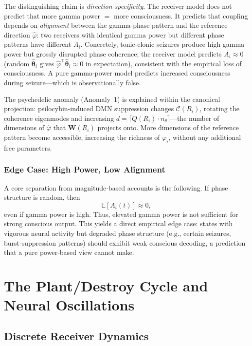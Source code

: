 \documentclass[12pt]{article}
\begin{document}
The distinguishing claim is \emph{direction-specificity}. The receiver model does not predict that more gamma power $= $ more consciousness. It predicts that coupling depends on \emph{alignment} between the gamma-phase pattern and the reference direction $\hat{\varphi}$: two receivers with identical gamma power but different phase patterns have different $A_i$. Concretely, tonic-clonic seizures produce high gamma power but grossly disrupted phase coherence; the receiver model predicts $A_i \approx 0$ (random $\hat{\boldsymbol{\theta}}_i$ gives $\hat{\varphi}^\top \hat{\boldsymbol{\theta}}_i \approx 0$ in expectation), consistent with the empirical loss of consciousness. A pure gamma-power model predicts increased consciousness during seizure---which is observationally false.

The psychedelic anomaly (Anomaly~1) is explained within the canonical projection: psilocybin-induced DMN suppression changes $\mathcal{C}(R_i)$, rotating the coherence eigenmodes and increasing $d = \lceil Q(R_i)\cdot n_\theta\rceil$---the number of dimensions of $\hat{\varphi}$ that $\mathbf{W}(R_i)$ projects onto. More dimensions of the reference pattern become accessible, increasing the richness of $\varphi_i$, without any additional free parameters.

\subsubsection*{Edge Case: High Power, Low Alignment}

A core separation from magnitude‑based accounts is the following. If phase structure is random, then
\begin{equation}
    \mathbb{E}[A_i(t)] \approx 0,
\end{equation}
even if gamma power is high. Thus, elevated gamma power is not sufficient for strong conscious output. This yields a direct empirical edge case: states with vigorous neural activity but degraded phase structure (e.g., certain seizures, burst‑suppression patterns) should exhibit weak conscious decoding, a prediction that a pure power‑based view cannot make.

\section{The Plant/Destroy Cycle and Neural Oscillations}

\subsection{Discrete Receiver Dynamics}
\end{document}

